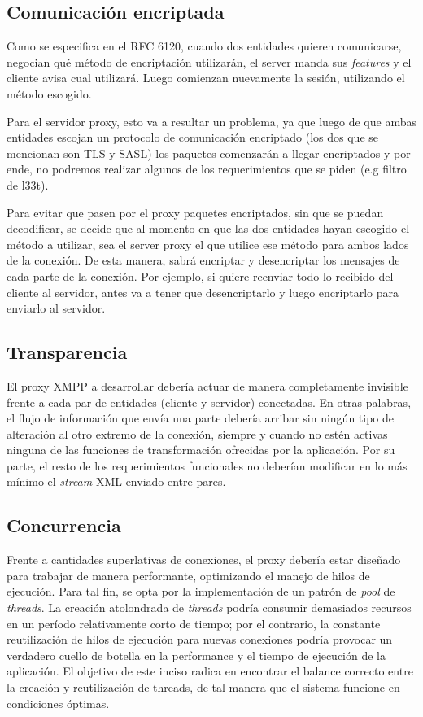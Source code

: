 \documentclass[a4paper,10pt]{article}
\begin{document}
\subsection{Comunicación encriptada}
Como se especifica en el RFC 6120, cuando dos entidades quieren comunicarse, negocian qué método de encriptación utilizarán, el server manda sus \textit{features}
y el cliente avisa cual utilizará. Luego comienzan nuevamente la sesión, utilizando el método escogido.
\par Para el servidor proxy, esto va a resultar un problema, ya que luego de que ambas entidades escojan un protocolo de comunicación encriptado (los dos que se mencionan
son TLS y SASL) los paquetes comenzarán a llegar encriptados y por ende, no podremos realizar algunos de los requerimientos que se piden (e.g filtro de l33t).
\par Para evitar que pasen por el proxy paquetes encriptados, sin que se puedan decodificar, se decide que al momento en que las dos entidades hayan escogido el método
a utilizar, sea el server proxy el que utilice ese método para ambos lados de la conexión. De esta manera, sabrá encriptar y desencriptar los mensajes de cada
parte de la conexión. Por ejemplo, si quiere reenviar todo lo recibido del cliente al servidor, antes va a tener que desencriptarlo y luego encriptarlo para
 enviarlo al servidor.

\subsection{Transparencia}
El proxy XMPP a desarrollar debería actuar de manera completamente invisible frente a cada par de entidades (cliente y servidor) conectadas.
En otras palabras, el flujo de información que envía una parte debería arribar sin ningún tipo de alteración al otro extremo
de la conexión, siempre y cuando no estén activas ninguna de las funciones de transformación ofrecidas por la aplicación. Por su parte, el resto
de los requerimientos funcionales no deberían modificar en lo más mínimo el \textit{stream} XML enviado entre pares.

\subsection{Concurrencia}
Frente a cantidades superlativas de conexiones, el proxy debería estar diseñado para trabajar de manera performante, optimizando el manejo de hilos de ejecución.
Para tal fin, se opta por la implementación de un patrón de \textit{pool} de \textit{threads}. La creación atolondrada de \textit{threads} podría consumir demasiados recursos
en un período relativamente corto de tiempo; por el contrario, la constante reutilización de hilos de ejecución para nuevas conexiones podría provocar un verdadero
cuello de botella en la performance y el tiempo de ejecución de la aplicación. El objetivo de este inciso radica en encontrar el balance correcto entre la creación y reutilización de threads,
de tal manera que el sistema funcione en condiciones óptimas.
\end{document}
